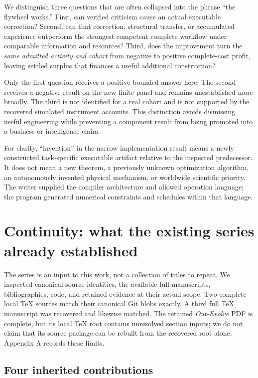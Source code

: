 We distinguish three questions that are often collapsed into the phrase
``the flywheel works.'' First, can verified criticism cause an actual
executable correction? Second, can that correction, structural transfer,
or accumulated experience outperform the strongest competent complete
workflow under comparable information and resources? Third, does the
improvement turn the \emph{same admitted activity and cohort} from
negative to positive complete-cost profit, leaving settled surplus that
finances a useful additional construction?

Only the first question receives a positive bounded answer here. The
second receives a negative result on the new finite panel and remains
unestablished more broadly. The third is not identified for a real
cohort and is not supported by the recovered simulated instrument
accounts. This distinction avoids dismissing useful engineering while
preventing a component result from being promoted into a business or
intelligence claim.

For clarity, ``invention'' in the narrow implementation result means a
newly constructed task-specific executable artifact relative to the
inspected predecessor. It does not mean a new theorem, a previously
unknown optimization algorithm, an autonomously invented physical
mechanism, or worldwide scientific priority. The writer supplied the
compiler architecture and allowed operation language; the program
generated numerical constraints and schedules within that language.

\section{Continuity: what the existing series already
established}\label{continuity}

The series is an input to this work, not a collection of titles to
repeat. We inspected canonical source identities, the available full
manuscripts, bibliographies, code, and retained evidence at their actual
scope. Two complete local TeX sources match their canonical Git blobs
exactly. A third full TeX manuscript was recovered and likewise matched.
The retained \emph{Out-Evolve} PDF is complete, but its local TeX root
contains unresolved section inputs; we do not claim that its source
package can be rebuilt from the recovered root alone. Appendix A records
these limits.

\subsection{Four inherited
contributions}\label{four-inherited-contributions}

